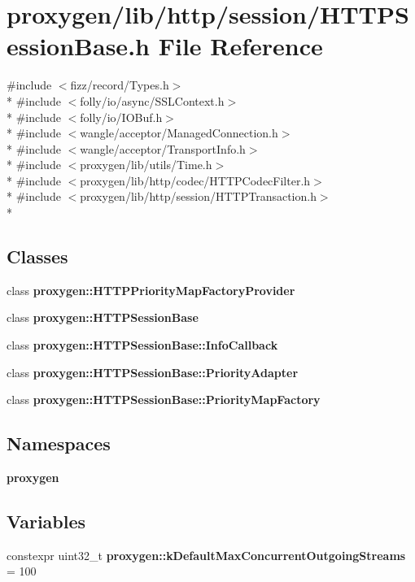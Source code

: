 \section{proxygen/lib/http/session/\+H\+T\+T\+P\+Session\+Base.h File Reference}
\label{HTTPSessionBase_8h}
{\ttfamily \#include $<$fizz/record/\+Types.\+h$>$}\\*
{\ttfamily \#include $<$folly/io/async/\+S\+S\+L\+Context.\+h$>$}\\*
{\ttfamily \#include $<$folly/io/\+I\+O\+Buf.\+h$>$}\\*
{\ttfamily \#include $<$wangle/acceptor/\+Managed\+Connection.\+h$>$}\\*
{\ttfamily \#include $<$wangle/acceptor/\+Transport\+Info.\+h$>$}\\*
{\ttfamily \#include $<$proxygen/lib/utils/\+Time.\+h$>$}\\*
{\ttfamily \#include $<$proxygen/lib/http/codec/\+H\+T\+T\+P\+Codec\+Filter.\+h$>$}\\*
{\ttfamily \#include $<$proxygen/lib/http/session/\+H\+T\+T\+P\+Transaction.\+h$>$}\\*
\subsection*{Classes}
\begin{DoxyCompactItemize}
\item 
class {\bf proxygen\+::\+H\+T\+T\+P\+Priority\+Map\+Factory\+Provider}
\item 
class {\bf proxygen\+::\+H\+T\+T\+P\+Session\+Base}
\item 
class {\bf proxygen\+::\+H\+T\+T\+P\+Session\+Base\+::\+Info\+Callback}
\item 
class {\bf proxygen\+::\+H\+T\+T\+P\+Session\+Base\+::\+Priority\+Adapter}
\item 
class {\bf proxygen\+::\+H\+T\+T\+P\+Session\+Base\+::\+Priority\+Map\+Factory}
\end{DoxyCompactItemize}
\subsection*{Namespaces}
\begin{DoxyCompactItemize}
\item 
 {\bf proxygen}
\end{DoxyCompactItemize}
\subsection*{Variables}
\begin{DoxyCompactItemize}
\item 
constexpr uint32\+\_\+t {\bf proxygen\+::k\+Default\+Max\+Concurrent\+Outgoing\+Streams} = 100
\end{DoxyCompactItemize}

